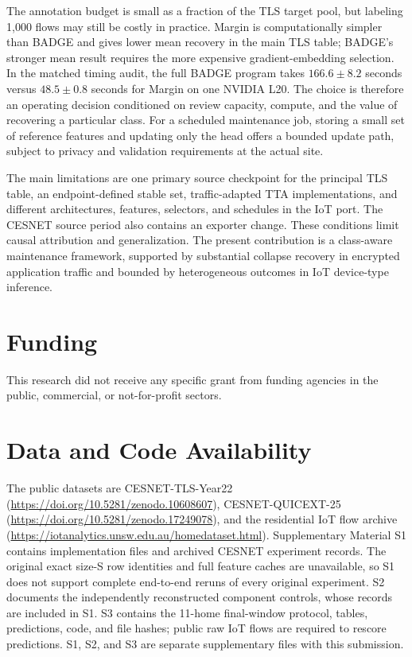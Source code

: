 \documentclass[journal]{IEEEtran}
\begin{document}
The annotation budget is small as a fraction of the TLS target pool, but labeling 1,000 flows may still be costly in practice. Margin is computationally simpler than BADGE and gives lower mean recovery in the main TLS table; BADGE's stronger mean result requires the more expensive gradient-embedding selection. In the matched timing audit, the full BADGE program takes $166.6\pm8.2$ seconds versus $48.5\pm0.8$ seconds for Margin on one NVIDIA L20. The choice is therefore an operating decision conditioned on review capacity, compute, and the value of recovering a particular class. For a scheduled maintenance job, storing a small set of reference features and updating only the head offers a bounded update path, subject to privacy and validation requirements at the actual site.

The main limitations are one primary source checkpoint for the principal TLS table, an endpoint-defined stable set, traffic-adapted TTA implementations, and different architectures, features, selectors, and schedules in the IoT port. The CESNET source period also contains an exporter change. These conditions limit causal attribution and generalization. The present contribution is a class-aware maintenance framework, supported by substantial collapse recovery in encrypted application traffic and bounded by heterogeneous outcomes in IoT device-type inference.

\section*{Funding}
This research did not receive any specific grant from funding agencies in the public, commercial, or not-for-profit sectors.

\section*{Data and Code Availability}
The public datasets are CESNET-TLS-Year22~\cite{hynek2024cesnet} (\url{https://doi.org/10.5281/zenodo.10608607}), CESNET-QUICEXT-25~\cite{cesnetquicext25} (\url{https://doi.org/10.5281/zenodo.17249078}), and the residential IoT flow archive~\cite{pashamokhtari2023dynamic} (\url{https://iotanalytics.unsw.edu.au/homedataset.html}). Supplementary Material S1 contains implementation files and archived CESNET experiment records. The original exact size-S row identities and full feature caches are unavailable, so S1 does not support complete end-to-end reruns of every original experiment. S2 documents the independently reconstructed component controls, whose records are included in S1. S3 contains the 11-home final-window protocol, tables, predictions, code, and file hashes; public raw IoT flows are required to rescore predictions. S1, S2, and S3 are separate supplementary files with this submission.
\end{document}
